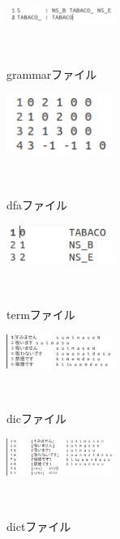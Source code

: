 \documentclass[11pt]{si2016}
\begin{document}
\begin{thebibliography}{1}
\begin{figure}[h]
 \begin{center}
  \includegraphics[width=35mm]{img/grammar.png}
 　\caption{grammarファイル}
 　\label{fig:grammar}
 \end{center}
\end{figure}


\begin{figure}[h]
 \begin{center}
  \includegraphics[width=35mm]{img/dfa.png}
 　\caption{dfaファイル}
 　\label{fig:dfa}
 \end{center}
\end{figure}


\begin{figure}[h]
 \begin{center}
  \includegraphics[width=35mm]{img/term.png}
 　\caption{termファイル}
 　\label{fig:term}
 \end{center}
\end{figure}


\begin{figure}[h]
 \begin{center}
  \includegraphics[width=35mm]{img/dic.png}
 　\caption{dicファイル}
 　\label{fig:dic}
 \end{center}
\end{figure}


\begin{figure}[h]
 \begin{center}
  \includegraphics[width=35mm]{img/dict.png}
 　\caption{dictファイル}
 　\label{fig:dict}
 \end{center}
\end{figure}



\end{thebibliography}
\end{document}
